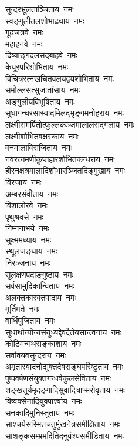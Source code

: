 \begin{multicols}{2}
\begin{flushleft}
सुन्दरभ्रूलताञ्चिताय~नमः\\
स्वङ्गुलीतलशोभाढ्याय~नमः\\
गूढजत्रवे~नमः\hfill{}\\
महाहनवे~नमः\\
दिव्याङ्गदलसद्बाहवे~नमः\\
केयूरपरिशोभिताय~नमः\\
विचित्ररत्नखचितवलयद्वय\-शोभिताय~नमः\\
समोल्लसत्सुजातांसाय~नमः\\
अङ्गुलीयविभूषिताय~नमः\\
सुधागन्धरसास्वादमिलद्भृङ्ग\-मनोहराय~नमः\\
लक्ष्मीसमर्पितोत्फुल्ल\-कञ्जमालालसद्गलाय~नमः\\
लक्ष्मीशोभितवक्षस्काय~नमः\\
वनमालाविराजिताय~नमः\hfill{}\\
नवरत्नमणीकॢप्तहारशोभित\-कन्धराय~नमः\\
हीरनक्षत्रमालादिशोभारञ्जित\-दिङ्मुखाय~नमः\\
विरजाय~नमः\\
अम्बरसंवीताय~नमः\\
विशालोरवे~नमः\\
पृथुश्रवसे~नमः\\
निम्ननाभये~नमः\\
सूक्ष्ममध्याय~नमः\\
स्थूलजङ्घाय~नमः\\
निरञ्जनाय~नमः\hfill{}\\
सुलक्षणपदाङ्गुष्ठाय~नमः\\
सर्वसामुद्रिकान्विताय~नमः\\
अलक्तकारक्तपादाय~नमः\\
मूर्तिमते~नमः\\
वार्धिपूजिताय~नमः\\
सुधार्थान्योन्यसंयुध्यद्देवदैतेय\-सान्त्वनाय~नमः\\
कोटिमन्मथसङ्काशाय~नमः\\
सर्वावयवसुन्दराय~नमः\\
अमृतास्वादनोद्युक्तदेवसङ्घ\-परिष्टुताय~नमः\\
पुष्पवर्षणसंयुक्तगन्धर्वकुल\-सेविताय~नमः\hfill{}\\
शङ्खतूर्यमृदङ्गादि\-सुवादित्राप्सरोवृताय~नमः\\
विष्वक्सेनादियुक्पार्श्वाय~नमः\\
सनकादिमुनिस्तुताय~नमः\\
साश्चर्यसस्मितचतुर्मुखनेत्र\-समीक्षिताय~नमः\\
साशङ्कसम्भ्रमदितिदनुवंश्य\-समीडिताय~नमः\\

\end{flushleft}
\end{multicols}
